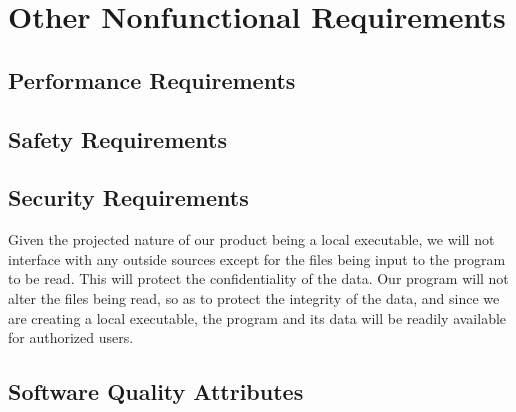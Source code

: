 \section{Other Nonfunctional Requirements}
%

\subsection{Performance Requirements}

\subsection{Safety Requirements}

\subsection{Security Requirements}
Given the projected nature of our product being a local executable, we will not interface with any outside sources except for the files being input to the program to be read. This will protect the confidentiality of the data. Our program will not alter the files being read, so as to protect the integrity of the data, and since we are creating a local executable, the program and its data will be readily available for authorized users.


\subsection{Software Quality Attributes}


